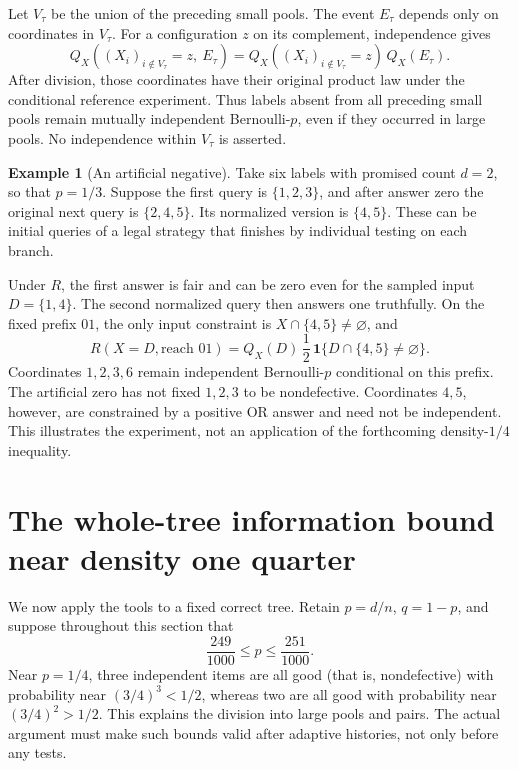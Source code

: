 \documentclass[11pt]{article}
\theoremstyle{definition}
\newtheorem{example}[theorem]{Example}
\theoremstyle{remark}
\numberwithin{equation}{section}
\begin{document}
Let \(V_\tau\) be the union of the preceding small pools.
The event \(E_\tau\) depends only on coordinates in \(V_\tau\).
For a configuration \(z\) on its complement, independence gives
\[
 Q_X((X_i)_{i\notin V_\tau}=z,\ E_\tau)
 =Q_X((X_i)_{i\notin V_\tau}=z)\,Q_X(E_\tau).
\]
After division, those coordinates have their original product law
under the conditional reference experiment. Thus labels absent from
all preceding small pools remain mutually independent Bernoulli-\(p\),
even if they occurred in large pools. No independence within
\(V_\tau\) is asserted.

\begin{example}[An artificial negative]
Take six labels with promised count \(d=2\), so that \(p=1/3\).
Suppose the first query is \(\{1,2,3\}\), and after
answer zero the original next query is \(\{2,4,5\}\). Its normalized
version is \(\{4,5\}\). These can be initial queries of a legal
strategy that finishes by individual testing on each branch.

Under \(R\), the first answer is fair and can be zero even for
the sampled input \(D=\{1,4\}\). The second normalized query then
answers one truthfully. On the fixed prefix \(01\), the only input
constraint is \(X\cap\{4,5\}\ne\varnothing\), and
\[
 R(X=D,\text{reach }01)
 =Q_X(D)\,\frac12\,\mathbf1\{D\cap\{4,5\}\ne\varnothing\}.
\]
Coordinates \(1,2,3,6\) remain independent Bernoulli-\(p\) conditional
on this prefix. The artificial zero has not fixed \(1,2,3\) to be
nondefective. Coordinates \(4,5\), however, are constrained by a positive OR
answer and need not be independent. This illustrates the experiment,
not an application of the forthcoming density-\(1/4\) inequality.
\end{example}

\section{The whole-tree information bound near density one quarter}
\label{sec:whole}

We now apply the tools to a fixed correct tree. Retain \(p=d/n\),
\(q=1-p\), and suppose throughout this section that
\begin{equation}\label{eq:localinterval}
 \frac{249}{1000}\le p\le\frac{251}{1000}.
\end{equation}
Near \(p=1/4\), three independent items are all good
(that is, nondefective) with probability
near \((3/4)^3<1/2\), whereas two are all good with probability near
\((3/4)^2>1/2\). This explains the division into large pools and
pairs. The actual argument must make such bounds valid after
adaptive histories, not only before any tests.
\end{document}
